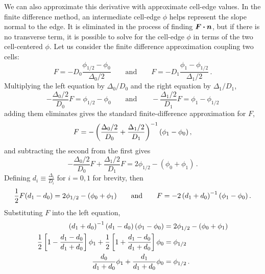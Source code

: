 We can also approximate this derivative with approximate cell-edge values. In
the finite difference method, an intermediate cell-edge $\phi$ helps represent
the slope normal to the edge. It is eliminated in the process of finding
$\bm{F}\bm{\cdot}\bm{n}$, but if there is no transverse term, it is possible to
solve for the cell-edge $\phi$ in terms of the two cell-centered $\phi$. Let us
consider the finite difference approximation coupling two cells:
\begin{equation*}
  F = - D_0 \frac{\phi_{1/2} - \phi_0}{\Delta_0/2}
  \qquad\text{and}\qquad
  F = - D_1 \frac{\phi_{1} - \phi_{1/2}}{\Delta_1/2}\,.
\end{equation*}
Multiplying the left equation by $\Delta_0 / D_0$ and the right equation by
$\Delta_1 / D_1$,
\begin{equation*}
  -\frac{\Delta_0/2}{D_0 } F = \phi_{1/2} - \phi_0
  \qquad\text{and}\qquad
  -\frac{\Delta_1/2}{D_1 } F = \phi_{1} - \phi_{1/2}
\end{equation*}
adding them eliminates gives the standard finite-difference approximation for $F$,
\begin{equation*}
  F = - \left( \frac{\Delta_0/2}{D_0 } + \frac{\Delta_1/2}{D_1 } \right)^{-1}
  \left( \phi_1 - \phi_0 \right),
\end{equation*}
and subtracting the second from the first gives
\begin{equation*}
 -\frac{\Delta_0/2}{D_0 }F + \frac{\Delta_1/2}{D_1 } F
 = 2 \phi_{1/2}-(\phi_0+\phi_1)\,.
\end{equation*}
Defining $ d_i \equiv \frac{\Delta_i}{D_i}$ for $i=0,1$ for brevity, then
\begin{equation*}
  \frac12 F (d_1 - d_0)
 = 2 \phi_{1/2}-(\phi_0+\phi_1)
  \qquad\text{and}\qquad
 F = -2\left( d_1 + d_0 \right)^{-1} (\phi_1 - \phi_0)\,.
\end{equation*}
Substituting $F$ into the left equation,
\begin{align*}
  \left( d_1 + d_0 \right)^{-1}\left(d_1 - d_0\right) (\phi_1 - \phi_0)
  &= 2 \phi_{1/2}-(\phi_0+\phi_1)
  \\
 \frac12 \left[ 1 - \frac{d_1 - d_0}{d_1 + d_0} \right] \phi_1
+ \frac12 \left[ 1 + \frac{d_1 - d_0}{d_1 + d_0} \right] \phi_0
 &= \phi_{1/2}
  \\
 \frac{d_0}{d_1 + d_0} \phi_1
+ \frac{d_1}{d_1 + d_0} \phi_0
 &= \phi_{1/2}\,.
\end{align*}

